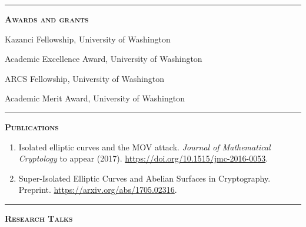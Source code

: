\documentclass[12pt]{article}
\newcommand{\sectionheading}[1]
{
\bigskip %
\noindent
\hspace{-6.5mm}\textcolor{Gray}{\rule[.75mm]{21.5mm}{1mm}} %
\hspace{.2mm}	%
{\large{\textbf{\textsc{#1}}}} %
}
\newenvironment{date_section}
	{
	\vspace{-1ex}
	\leftmargini = 15ex
		\begin{itemize}[
			labelsep = *,
			labelwidth = 9ex,
			labelindent = 0ex,
			itemindent = !,
			font=\normalfont,
			align=parleft
		]{}
		\itemsep=-1.5mm
	}
	{\end{itemize}\vspace{-2ex}}
\newcommand{\yearmo}[2]{
	\item[
		{\makebox[1ex][r]{#1}}
		\hspace{1ex}
		{\makebox[1ex][l]{#2} }
		] }
\begin{document}
	\sectionheading{Awards and grants}%

		\begin{date_section}
			\yearmo{}{2017}%
				Kazanci Fellowship, University of Washington
			\yearmo{}{2014}%
				Academic Excellence Award, University of Washington
			\yearmo{}{2013}%
				ARCS Fellowship, University of Washington
			\yearmo{}{2013}%
				Academic Merit Award, University of Washington
		\end{date_section}

	\sectionheading{Publications}%
	
	\begin{enumerate}[itemsep=-1mm, leftmargin=24mm]
		
		\item
		{Isolated elliptic curves and the MOV attack.}
		\textit{Journal of Mathematical Cryptology} to appear (2017). \url{https://doi.org/10.1515/jmc-2016-0053}.
		
		\item
		{Super-Isolated Elliptic Curves and Abelian Surfaces in Cryptography.}
		Preprint.
		\url{https://arxiv.org/abs/1705.02316}.
		
	\end{enumerate}



%
%
%
%

	\sectionheading{Research Talks} %
\end{document}
